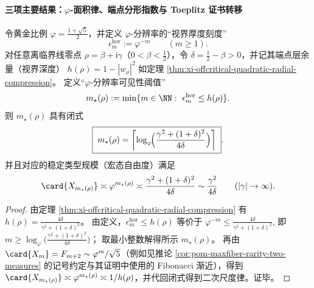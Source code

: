 \paragraph{三项主要结果：\texorpdfstring{$\varphi$}{phi}-面积律、端点分形指数与 Toeplitz 证书转移}
\begin{theorem}\label{thm:xi-bulk-horizon-phi-area-law}
令黄金比例 \(\varphi=\frac{1+\sqrt5}{2}\)，并定义 \(\varphi\)-分辨率的“视界厚度刻度”
\[
\epsilon_m^{\mathrm{hor}}:=\varphi^{-m}\qquad(m\ge 1).
\]
对任意离临界线零点 \(\rho=\beta+\mathrm{i}\gamma\)（\(0<\beta<\tfrac12\)），令 \(\delta=\tfrac12-\beta>0\)，并记其端点层余量（视界深度）
\(
h(\rho)=1-|w_\rho|^2
\)
如定理 \ref{thm:xi-offcritical-quadratic-radial-compression}。
定义“\(\varphi\)-分辨率可见性阈值”
\[
m_\star(\rho):=\min\{m\in\NN:\ \epsilon_m^{\mathrm{hor}}\le h(\rho)\}.
\]
则 \(m_\star(\rho)\) 具有闭式
\[
\boxed{\;
m_\star(\rho)=\left\lceil \log_{\varphi}\!\Bigl(\frac{\gamma^2+(1+\delta)^2}{4\delta}\Bigr)\right\rceil\; }.
\]
并且对应的稳定类型规模（宏态自由度）满足
\[
\card{X_{m_\star(\rho)}}\asymp \varphi^{m_\star(\rho)}
\asymp \frac{\gamma^2+(1+\delta)^2}{4\delta}
\sim \frac{\gamma^2}{4\delta}\qquad(|\gamma|\to\infty).
\]
\end{theorem}
\begin{proof}
由定理 \ref{thm:xi-offcritical-quadratic-radial-compression} 有
\(
h(\rho)=\frac{4\delta}{\gamma^2+(1+\delta)^2}
\)。
由定义，\(\epsilon_m^{\mathrm{hor}}\le h(\rho)\) 等价于
\(
\varphi^{-m}\le \frac{4\delta}{\gamma^2+(1+\delta)^2}
\),
即
\(
m\ge \log_{\varphi}\!\bigl(\frac{\gamma^2+(1+\delta)^2}{4\delta}\bigr)
\)；
取最小整数解得所示 \(m_\star(\rho)\)。
再由 \(\card{X_m}=F_{m+2}\sim \varphi^m/\sqrt5\)（例如见推论 \ref{cor:pom-maxfiber-rarity-two-measures} 的记号约定与其证明中使用的 Fibonacci 渐近），得到
\(\card{X_{m_\star(\rho)}}\asymp \varphi^{m_\star(\rho)}\asymp 1/h(\rho)\)，并代回闭式得到二次尺度律。证毕。
\end{proof}

